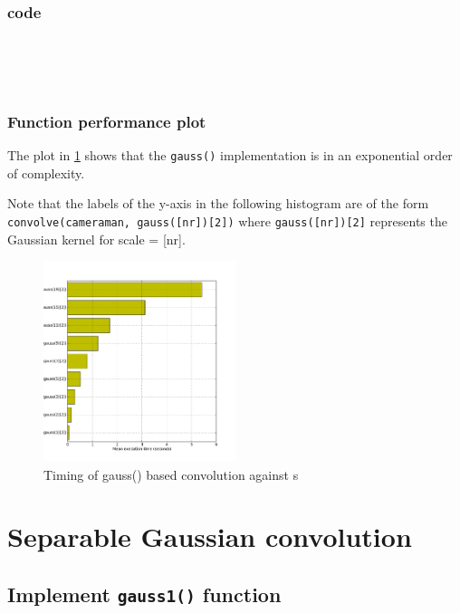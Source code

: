 \documentclass[abstract=true]{scrartcl}
\begin{document}
        \subsubsection{code}

            \begin{verbatim}




            \end{verbatim}

        \subsubsection{Function performance plot}

            The plot in \ref{timing1} shows that the \texttt{gauss()}
            implementation is in an exponential order of complexity. 

            Note that the labels of the y-axis in the following histogram are of
            the form \texttt{convolve(cameraman, gauss([nr])[2])} where
            \texttt{gauss([nr])[2]} represents the Gaussian kernel for scale =
            [nr].
        
            \begin{figure}
              \centering
              \includegraphics[width=0.5\textwidth]{../images/3_time_gauss}
              \caption{Timing of gauss() based convolution against s}
              \label{timing1}
            \end{figure}


\section{Separable Gaussian convolution}

    \subsection{Implement \texttt{gauss1()} function}
\end{document}
